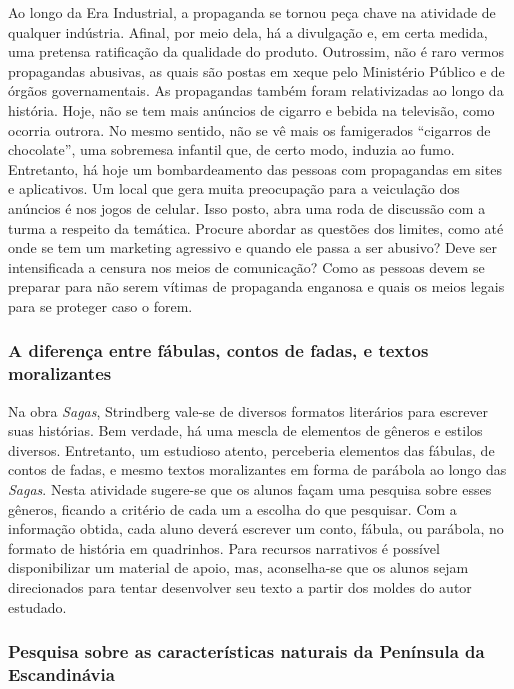 \documentclass[12pt]{extarticle}
\begin{document}
Ao longo da Era Industrial, a propaganda se tornou peça chave na
atividade de qualquer indústria. Afinal, por meio dela, há a
divulgação e, em certa medida, uma pretensa ratificação da qualidade
do produto. Outrossim, não é raro vermos propagandas abusivas, as
quais são postas em xeque pelo Ministério Público e de órgãos
governamentais. As propagandas também foram relativizadas ao longo da
história. Hoje, não se tem mais anúncios de cigarro e bebida na
televisão, como ocorria outrora. No mesmo sentido, não se vê mais os
famigerados ``cigarros de chocolate'', uma sobremesa infantil que, de
certo modo, induzia ao fumo. Entretanto, há hoje um bombardeamento das
pessoas com propagandas em sites e aplicativos. Um local que gera
muita preocupação para a veiculação dos anúncios é nos jogos de
celular. Isso posto, abra uma roda de discussão com a turma a respeito
da temática. Procure abordar as questões dos limites, como até onde se
tem um marketing agressivo e quando ele passa a ser abusivo? Deve ser
intensificada a censura nos meios de comunicação? Como as pessoas
devem se preparar para não serem vítimas de propaganda enganosa e
quais os meios legais para se proteger caso o forem.

\subsubsection{A diferença entre fábulas, contos de fadas, e
textos moralizantes}


Na obra \emph{Sagas}, Strindberg vale-se de diversos formatos
literários para escrever suas histórias. Bem verdade, há uma mescla de
elementos de gêneros e estilos diversos. Entretanto, um estudioso
atento, perceberia elementos das fábulas, de contos de fadas, e mesmo
textos moralizantes em forma de parábola ao longo das \emph{Sagas}.
Nesta atividade sugere-se que os alunos façam uma pesquisa sobre esses
gêneros, ficando a critério de cada um a escolha do que pesquisar. Com
a informação obtida, cada aluno deverá escrever um conto, fábula, ou
parábola, no formato de história em quadrinhos. Para recursos
narrativos é possível disponibilizar um material de apoio, mas,
aconselha-se que os alunos sejam direcionados para tentar desenvolver
seu texto a partir dos moldes do autor estudado.

\subsubsection{Pesquisa sobre as características naturais da Península da
Escandinávia}
\end{document}
